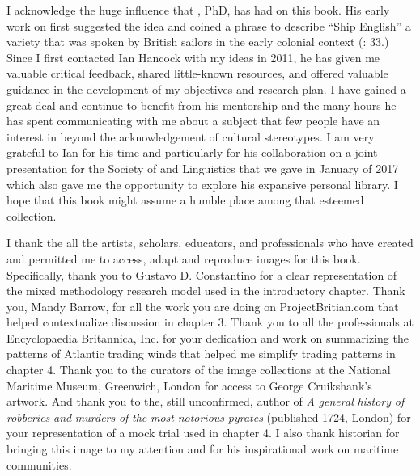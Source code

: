 I acknowledge the huge influence that , PhD, has had on this book. His early work on  first suggested the idea and coined a phrase to describe “Ship English” a variety that was spoken by British sailors in the early colonial context (\citealt{Hancock1976}: 33.) Since I first contacted Ian Hancock with my ideas in 2011, he has given me valuable critical feedback, shared little-known resources, and offered valuable guidance in the development of my objectives and research plan. I have gained a great deal and continue to benefit from his mentorship and the many hours he has spent communicating with me about a subject that few people have an interest in beyond the acknowledgement of cultural stereotypes. I am very grateful to Ian for his time and particularly for his collaboration on a joint-presentation for the Society of  and  Linguistics that we gave in January of 2017 which also gave me the opportunity to explore his expansive personal library. I hope that this book might assume a humble place among that esteemed collection. 

I thank the all the artists, scholars, educators, and professionals who have created and permitted me to access, adapt and reproduce images for this book. Specifically, thank you to Gustavo D. Constantino for a clear representation of the mixed methodology research model used in the introductory chapter. Thank you, Mandy Barrow, for all the work you are doing on ProjectBritian.com that helped contextualize discussion in chapter 3. Thank you to all the professionals at Encyclopaedia Britannica, Inc. for your dedication and work on summarizing the patterns of Atlantic trading winds that helped me simplify trading patterns in chapter 4. Thank you to the curators of the image collections at the National Maritime Museum, Greenwich, London for access to George Cruikshank’s artwork. And thank you to the, still unconfirmed, author of \textit{A} \textit{general} \textit{history} \textit{of} \textit{robberies} \textit{and} \textit{murders} \textit{of} \textit{the} \textit{most} \textit{notorious} \textit{pyrates} (published 1724, London) for your representation of a mock trial used in chapter 4. I also thank historian  for bringing this image to my attention and for his inspirational work on maritime communities. 

